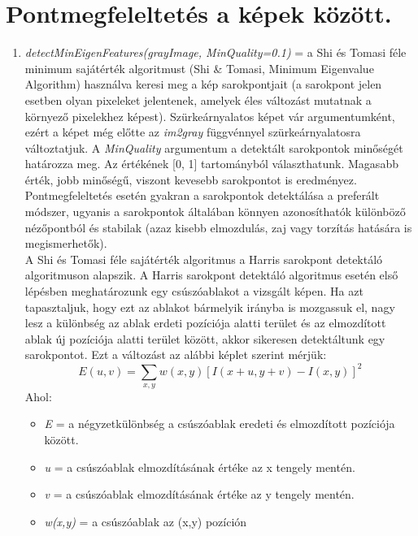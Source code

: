 \documentclass[12pt]{report}
\begin{document}
            \section{Pontmegfeleltetés a képek között.}
                \begin{enumerate}
                    \item \textit{detectMinEigenFeatures(grayImage, MinQuality=0.1)} = a Shi és Tomasi féle minimum sajátérték algoritmust (Shi \& Tomasi, Minimum Eigenvalue Algorithm) használva keresi meg a kép sarokpontjait (a sarokpont jelen esetben olyan pixeleket jelentenek, amelyek éles változást mutatnak a környező pixelekhez képest). Szürkeárnyalatos képet vár argumentumként, ezért a képet még előtte az \textit{im2gray} függvénnyel szürkeárnyalatosra változtatjuk. A \textit{MinQuality} argumentum a detektált sarokpontok minőségét határozza meg. Az értékének [0, 1] tartományból választhatunk. Magasabb érték, jobb minőségű, viszont kevesebb sarokpontot is eredményez.
                    Pontmegfeleltetés esetén gyakran a sarokpontok detektálása a preferált módszer, ugyanis a sarokpontok általában könnyen azonosíthatók különböző nézőpontból és stabilak (azaz kisebb elmozdulás, zaj vagy torzítás hatására is megismerhetők).\\
                    A Shi és Tomasi féle sajátérték algoritmus a Harris sarokpont detektáló algoritmuson alapszik. A Harris sarokpont detektáló algoritmus esetén első lépésben meghatározunk egy csúszóablakot a vizsgált képen. Ha azt tapasztaljuk, hogy ezt az ablakot bármelyik irányba is mozgassuk el, nagy lesz a különbség az ablak erdeti pozíciója alatti terület és az elmozdított ablak új pozíciója alatti terület között, akkor sikeresen detektáltunk egy sarokpontot. Ezt a változást az alábbi képlet szerint mérjük:
                    \[E(u,v) = \sum_{x,y}w(x,y)[I(x+u,y+v) - I(x,y)]^2\]
                    Ahol:\\ 
                    \begin{itemize}
                        \item \textit{E} = a négyzetkülönbség a csúszóablak eredeti és elmozdított pozíciója között.
                        \item \textit{u} = a csúszóablak elmozdításának értéke az x tengely mentén.
                        \item \textit{v} = a csúszóablak elmozdításának értéke az y tengely mentén.
                        \item \textit{w(x,y)} = a csúszóablak az (x,y) pozíción

\end{itemize}
\end{enumerate}
\end{document}
